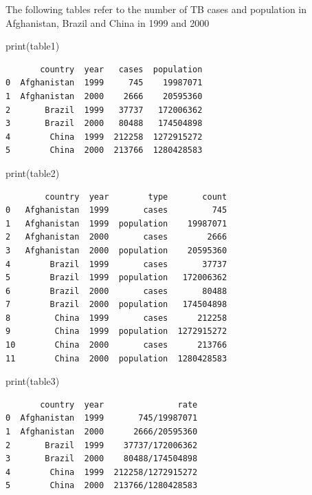 \documentclass[
  letterpaper,
]{scrbook}
\newenvironment{Shaded}{\begin{snugshade}}{\end{snugshade}}
\newcommand{\BuiltInTok}[1]{#1}
\newcommand{\NormalTok}[1]{#1}
\begin{document}
The following tables refer to the number of TB cases and population in Afghanistan, Brazil and China in 1999 and 2000

\begin{Shaded}
\begin{Highlighting}[]
\BuiltInTok{print}\NormalTok{(table1)}
\end{Highlighting}
\end{Shaded}

\begin{verbatim}
       country  year   cases  population
0  Afghanistan  1999     745    19987071
1  Afghanistan  2000    2666    20595360
2       Brazil  1999   37737   172006362
3       Brazil  2000   80488   174504898
4        China  1999  212258  1272915272
5        China  2000  213766  1280428583
\end{verbatim}

\begin{Shaded}
\begin{Highlighting}[]
\BuiltInTok{print}\NormalTok{(table2)}
\end{Highlighting}
\end{Shaded}

\begin{verbatim}
        country  year        type       count
0   Afghanistan  1999       cases         745
1   Afghanistan  1999  population    19987071
2   Afghanistan  2000       cases        2666
3   Afghanistan  2000  population    20595360
4        Brazil  1999       cases       37737
5        Brazil  1999  population   172006362
6        Brazil  2000       cases       80488
7        Brazil  2000  population   174504898
8         China  1999       cases      212258
9         China  1999  population  1272915272
10        China  2000       cases      213766
11        China  2000  population  1280428583
\end{verbatim}

\begin{Shaded}
\begin{Highlighting}[]
\BuiltInTok{print}\NormalTok{(table3)}
\end{Highlighting}
\end{Shaded}

\begin{verbatim}
       country  year               rate
0  Afghanistan  1999       745/19987071
1  Afghanistan  2000      2666/20595360
2       Brazil  1999    37737/172006362
3       Brazil  2000    80488/174504898
4        China  1999  212258/1272915272
5        China  2000  213766/1280428583
\end{verbatim}
\end{document}
